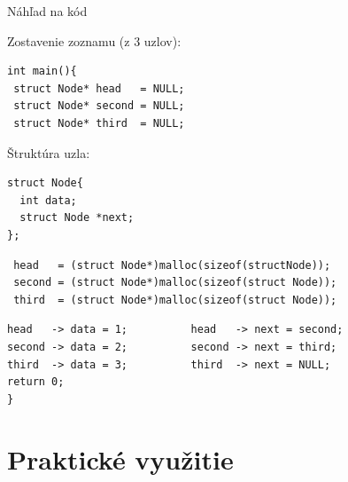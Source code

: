 \documentclass[slovak, 11pt]{beamer}
\begin{document}
\begin{frame}[fragile]{Náhľad na kód}
    \begin{minipage}{0.50\textwidth}
    \begin{exampleblock}{Zostavenie zoznamu (z 3 uzlov):}

\begin{verbatim}
int main(){
 struct Node* head   = NULL;
 struct Node* second = NULL;
 struct Node* third  = NULL;\end{verbatim}
 
    \end{exampleblock}
    \end{minipage}
    \hspace{0.5cm}
    \begin{minipage}{0.35\textwidth}
    \begin{block}{Štruktúra uzla:}
    
\begin{verbatim}
struct Node{
  int data;
  struct Node *next;
};\end{verbatim}

    \end{block}
    \end{minipage}
    \begin{exampleblock}{}
    
\begin{verbatim}
 head   = (struct Node*)malloc(sizeof(structNode));
 second = (struct Node*)malloc(sizeof(struct Node));
 third  = (struct Node*)malloc(sizeof(struct Node));\end{verbatim}
 
    \end{exampleblock}
    \begin{exampleblock}{}

\begin{verbatim}
head   -> data = 1;          head   -> next = second;
second -> data = 2;          second -> next = third;
third  -> data = 3;          third  -> next = NULL;
return 0;
}\end{verbatim}

    \end{exampleblock}
\end{frame}


\section{Praktické využitie}
\end{document}
